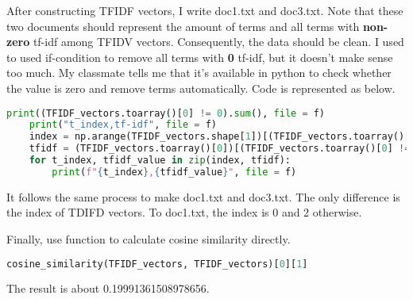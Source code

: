\documentclass[a4paper]{article}
\theoremstyle{plain}
\begin{document}
After constructing TFIDF vectors, I write doc1.txt and doc3.txt.
Note that these two documents should represent the amount of terms
and all terms with {\bf non-zero} tf-idf among TFIDV vectors. 
Consequently, the data should be clean. I used to used if-condition
to remove all terms with {\bf 0} tf-idf, but it doesn't make sense too much.
My classmate tells me that it's available in python to check whether the 
value is zero and remove terms automatically. Code is represented as below.
\begin{lstlisting}[language=Python]
    print((TFIDF_vectors.toarray()[0] != 0).sum(), file = f)
    print("t_index,tf-idf", file = f)
    index = np.arange(TFIDF_vectors.shape[1])[(TFIDF_vectors.toarray()[0] != 0)]
    tfidf = (TFIDF_vectors.toarray()[0])[(TFIDF_vectors.toarray()[0] != 0)]
    for t_index, tfidf_value in zip(index, tfidf):
        print(f"{t_index},{tfidf_value}", file = f)
\end{lstlisting}
It follows the same process to make doc1.txt and doc3.txt. The only
difference is the index of TDIFD vectors. To doc1.txt, the index is 0
and 2 otherwise.

Finally, use function to calculate cosine similarity directly.
\begin{lstlisting}[language=Python]
    cosine_similarity(TFIDF_vectors, TFIDF_vectors)[0][1]
\end{lstlisting}
The result is about 0.19991361508978656.


\end{document}
